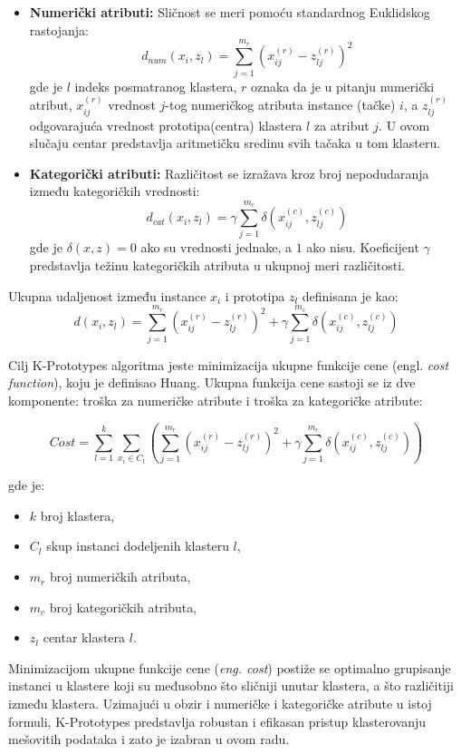 \documentclass[a4paper,12pt]{article}
\begin{document}
\begin{itemize}
    \item \textbf{Numerički atributi:} Sličnost se meri pomoću standardnog Euklidskog rastojanja:
    \[
    d_{num}(x_i, z_l) = \sum_{j=1}^{m_r} (x_{ij}^{(r)} - z_{lj}^{(r)})^2
    \]
    gde je $l$ indeks posmatranog klastera, $r$ oznaka da je u pitanju numerički atribut, $x_{ij}^{(r)}$ vrednost $j$-tog numeričkog atributa instance (tačke) $i$, a $z_{lj}^{(r)}$ odgovarajuća vrednost prototipa(centra) klastera $l$ za atribut $j$. U ovom slučaju centar predstavlja aritmetičku sredinu svih tačaka u tom klasteru.

    \item \textbf{Kategorički atributi:} Različitost se izražava kroz broj nepodudaranja između kategoričkih vrednosti:
    \[
    d_{cat}(x_i, z_l) = \gamma \sum_{j=1}^{m_c} \delta(x_{ij}^{(c)}, z_{lj}^{(c)})
    \]
    gde je $\delta(x, z) = 0$ ako su vrednosti jednake, a $1$ ako nisu. Koeficijent $\gamma$ predstavlja težinu kategoričkih atributa u ukupnoj meri različitosti.
    
\end{itemize}
Ukupna udaljenost između instance $x_i$ i prototipa $z_l$ definisana je kao:
\[
d(x_i, z_l) = \sum_{j=1}^{m_r} (x_{ij}^{(r)} - z_{lj}^{(r)})^2 + \gamma \sum_{j=1}^{m_c} \delta(x_{ij}^{(c)}, z_{lj}^{(c)})
\]

Cilj K-Prototypes algoritma jeste minimizacija ukupne funkcije cene (engl. \textit{cost function}), koju je definisao Huang. Ukupna funkcija cene sastoji se iz dve komponente: troška za numeričke atribute i troška za kategoričke atribute:

\[
Cost = \sum_{l=1}^{k} \sum_{x_i \in C_l} \left( \sum_{j=1}^{m_r} (x_{ij}^{(r)} - z_{lj}^{(r)})^2 + \gamma \sum_{j=1}^{m_c} \delta(x_{ij}^{(c)}, z_{lj}^{(c)}) \right)
\]

gde je:
\begin{itemize}
    \item $k$ broj klastera,
    \item $C_l$ skup instanci dodeljenih klasteru $l$,
    \item $m_r$ broj numeričkih atributa,
    \item $m_c$ broj kategoričkih atributa,
    \item $z_l$ centar klastera $l$.
\end{itemize}
Minimizacijom ukupne funkcije cene (\textit{eng. cost}) postiže se optimalno grupisanje instanci u klastere koji su međusobno što sličniji unutar klastera, a što različitiji između klastera. Uzimajući u obzir i numeričke i kategoričke atribute u istoj formuli, K-Prototypes predstavlja robustan i efikasan pristup klasterovanju mešovitih podataka i zato je izabran u ovom radu.
\end{document}
